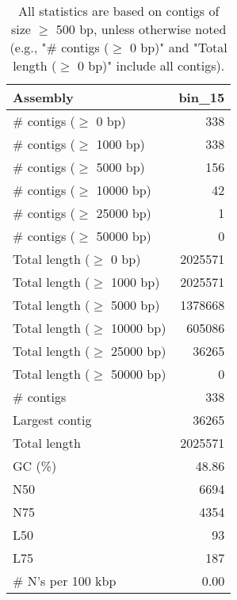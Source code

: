 \documentclass[12pt,a4paper]{article}
\begin{document}
\begin{table}[ht]
\begin{center}
\caption{All statistics are based on contigs of size $\geq$ 500 bp, unless otherwise noted (e.g., "\# contigs ($\geq$ 0 bp)" and "Total length ($\geq$ 0 bp)" include all contigs).}
\begin{tabular}{|l*{1}{|r}|}
\hline
Assembly & bin\_15 \\ \hline
\# contigs ($\geq$ 0 bp) & 338 \\ \hline
\# contigs ($\geq$ 1000 bp) & 338 \\ \hline
\# contigs ($\geq$ 5000 bp) & 156 \\ \hline
\# contigs ($\geq$ 10000 bp) & 42 \\ \hline
\# contigs ($\geq$ 25000 bp) & 1 \\ \hline
\# contigs ($\geq$ 50000 bp) & 0 \\ \hline
Total length ($\geq$ 0 bp) & 2025571 \\ \hline
Total length ($\geq$ 1000 bp) & 2025571 \\ \hline
Total length ($\geq$ 5000 bp) & 1378668 \\ \hline
Total length ($\geq$ 10000 bp) & 605086 \\ \hline
Total length ($\geq$ 25000 bp) & 36265 \\ \hline
Total length ($\geq$ 50000 bp) & 0 \\ \hline
\# contigs & 338 \\ \hline
Largest contig & 36265 \\ \hline
Total length & 2025571 \\ \hline
GC (\%) & 48.86 \\ \hline
N50 & 6694 \\ \hline
N75 & 4354 \\ \hline
L50 & 93 \\ \hline
L75 & 187 \\ \hline
\# N's per 100 kbp & 0.00 \\ \hline
\end{tabular}
\end{center}
\end{table}
\end{document}
